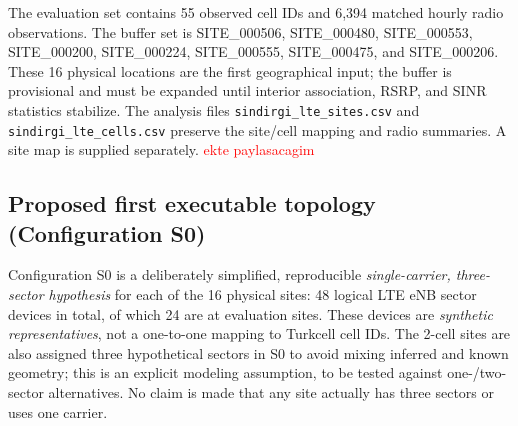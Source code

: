 \documentclass[11pt,a4paper]{article}
\newcommand{\red}[1]{\textcolor{red}{#1}}
\begin{document}
The evaluation set contains 55 observed cell IDs and 6,394 matched hourly radio observations. The buffer set is SITE\_000506, SITE\_000480, SITE\_000553, SITE\_000200, SITE\_000224, SITE\_000555, SITE\_000475, and SITE\_000206. These 16 physical locations are the first geographical input; the buffer is provisional and must be expanded until interior association, RSRP, and SINR statistics stabilize. The analysis files \texttt{sindirgi\_lte\_sites.csv} and \texttt{sindirgi\_lte\_cells.csv} preserve the site/cell mapping and radio summaries. A site map is supplied separately. \red{ekte paylasacagim}

\subsection{Proposed first executable topology (Configuration S0)}
Configuration S0 is a deliberately simplified, reproducible \emph{single-carrier, three-sector hypothesis} for each of the 16 physical sites: 48 logical LTE eNB sector devices in total, of which 24 are at evaluation sites. These devices are \emph{synthetic representatives}, not a one-to-one mapping to Turkcell cell IDs. The 2-cell sites are also assigned three hypothetical sectors in S0 to avoid mixing inferred and known geometry; this is an explicit modeling assumption, to be tested against one-/two-sector alternatives. No claim is made that any site actually has three sectors or uses one carrier.
\end{document}
